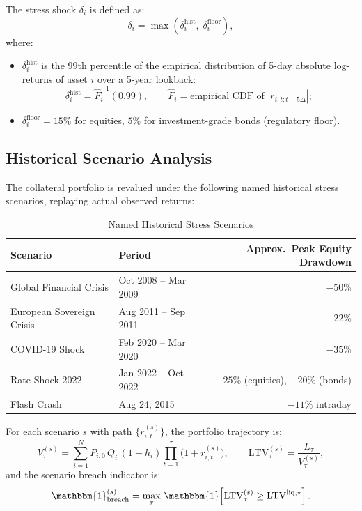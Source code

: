 \documentclass[12pt, a4paper]{article}
\newcommand{\LTV}{\mathrm{LTV}}
\newcommand{\1}{\mathbbm{1}}
\begin{document}
The stress shock $\delta_i$ is defined as:
\[
\delta_i = \max\!\left(\delta_i^{\mathrm{hist}},\;\delta_i^{\mathrm{floor}}\right),
\]
where:
\begin{itemize}[leftmargin=1.5em]
    \item $\delta_i^{\mathrm{hist}}$ is the 99th percentile of the empirical
    distribution of 5-day absolute log-returns of asset $i$ over a 5-year lookback:
    \[
    \delta_i^{\mathrm{hist}} = \widehat{F}_i^{-1}(0.99),\qquad
    \widehat{F}_i = \text{empirical CDF of }|r_{i,t:t+5\Delta}|;
    \]
    \item $\delta_i^{\mathrm{floor}} = 15\%$ for equities, $5\%$ for investment-grade
    bonds (regulatory floor).
\end{itemize}

\subsection{Historical Scenario Analysis}

The collateral portfolio is revalued under the following named historical
stress scenarios, replaying actual observed returns:

\begin{table}[H]
\centering
\caption{Named Historical Stress Scenarios}
\label{tab:scenarios}
\begin{tabular}{llr}
\toprule
\textbf{Scenario} & \textbf{Period} & \textbf{Approx.\ Peak Equity Drawdown} \\
\midrule
Global Financial Crisis   & Oct 2008 -- Mar 2009 & $-50\%$ \\
European Sovereign Crisis & Aug 2011 -- Sep 2011 & $-22\%$ \\
COVID-19 Shock            & Feb 2020 -- Mar 2020 & $-35\%$ \\
Rate Shock 2022           & Jan 2022 -- Oct 2022 & $-25\%$ (equities), $-20\%$ (bonds) \\
Flash Crash               & Aug 24, 2015         & $-11\%$ intraday \\
\bottomrule
\end{tabular}
\end{table}

For each scenario $s$ with path $\{r_{i,t}^{(s)}\}$, the portfolio trajectory is:
\[
V_\tau^{(s)} = \sum_{i=1}^{N} P_{i,0}\,Q_i\,(1-h_i)
\prod_{t=1}^{\tau}\bigl(1 + r_{i,t}^{(s)}\bigr),
\qquad \LTV_\tau^{(s)} = \frac{L_\tau}{V_\tau^{(s)}},
\]
and the scenario breach indicator is:
\[
\mathbbm{1}^{(s)}_{\mathrm{breach}}
= \max_{\tau}\,\mathbbm{1}\!\left[\LTV_\tau^{(s)} \geq \LTV^{\mathrm{liq},\star}\right].
\]
\end{document}
